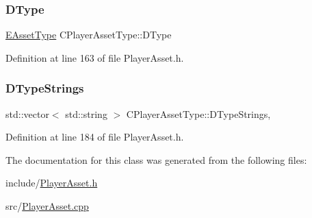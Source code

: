 \hypertarget{classCPlayerAssetType_a2a52bda918a79ecf5582314ef1f61c8a}{}\label{classCPlayerAssetType_a2a52bda918a79ecf5582314ef1f61c8a} 
\subsubsection{\texorpdfstring{D\+Type}{DType}}
{\footnotesize\ttfamily \hyperlink{GameDataTypes_8h_a5600d4fc433b83300308921974477fec}{E\+Asset\+Type} C\+Player\+Asset\+Type\+::\+D\+Type\hspace{0.3cm}{\ttfamily [protected]}}



Definition at line 163 of file Player\+Asset.\+h.

\hypertarget{classCPlayerAssetType_a1f87f6f8c42b692a500c875e9359a438}{}\label{classCPlayerAssetType_a1f87f6f8c42b692a500c875e9359a438} 
\subsubsection{\texorpdfstring{D\+Type\+Strings}{DTypeStrings}}
{\footnotesize\ttfamily std\+::vector$<$ std\+::string $>$ C\+Player\+Asset\+Type\+::\+D\+Type\+Strings\hspace{0.3cm}{\ttfamily [static]}, {\ttfamily [protected]}}



Definition at line 184 of file Player\+Asset.\+h.



The documentation for this class was generated from the following files\+:\begin{DoxyCompactItemize}
\item 
include/\hyperlink{PlayerAsset_8h}{Player\+Asset.\+h}\item 
src/\hyperlink{PlayerAsset_8cpp}{Player\+Asset.\+cpp}\end{DoxyCompactItemize}
